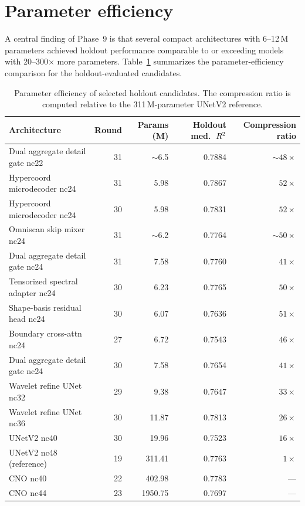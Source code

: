 ﻿\documentclass[preprint,12pt,authoryear]{elsarticle}
\newcommand{\rTwo}{R\textsuperscript{2}}
\begin{document}
\section{Parameter efficiency}
\label{sec:efficiency}

A central finding of Phase~9 is that several compact architectures with 6--12\,M parameters achieved holdout performance comparable to or exceeding models with 20--300$\times$ more parameters.
Table~\ref{tab:efficiency} summarizes the parameter-efficiency comparison for the holdout-evaluated candidates.

\begin{table}[htbp]
\centering
\caption{Parameter efficiency of selected holdout candidates. The compression ratio is computed relative to the 311\,M-parameter UNetV2 reference.}
\label{tab:efficiency}
\small
\begin{tabular}{l r r r r}
\toprule
Architecture & Round & Params (M) & Holdout med.\ $\rTwo{}$ & Compression ratio\\
\midrule
Dual aggregate detail gate nc22 & 31 & $\sim$6.5 & 0.7884 & $\sim$$48\times$ \\
Hypercoord microdecoder nc24 & 31 & 5.98 & 0.7867 & $52\times$ \\
Hypercoord microdecoder nc24 & 30 & 5.98 & 0.7831 & $52\times$ \\
Omniscan skip mixer nc24 & 31 & $\sim$6.2 & 0.7764 & $\sim$$50\times$ \\
Dual aggregate detail gate nc24 & 31 & 7.58 & 0.7760 & $41\times$ \\
Tensorized spectral adapter nc24 & 30 & 6.23 & 0.7765 & $50\times$ \\
Shape-basis residual head nc24 & 30 & 6.07 & 0.7636 & $51\times$ \\
Boundary cross-attn nc24 & 27 & 6.72 & 0.7543 & $46\times$ \\
Dual aggregate detail gate nc24 & 30 & 7.58 & 0.7654 & $41\times$ \\
Wavelet refine UNet nc32 & 29 & 9.38 & 0.7647 & $33\times$ \\
Wavelet refine UNet nc36 & 30 & 11.87 & 0.7813 & $26\times$ \\
UNetV2 nc40 & 30 & 19.96 & 0.7523 & $16\times$ \\
UNetV2 nc48 (reference) & 19 & 311.41 & 0.7763 & $1\times$ \\
CNO nc40 & 22 & 402.98 & 0.7783 & --- \\
CNO nc44 & 23 & 1950.75 & 0.7697 & --- \\
\bottomrule
\end{tabular}
\end{table}
\end{document}
